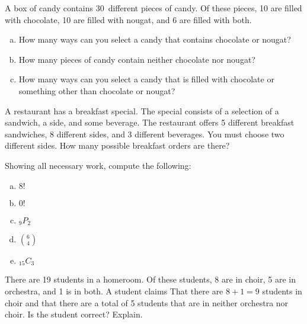 \documentclass[11pt,letterpaper]{article}
\begin{document}

 A box of candy contains 30~different pieces of candy. Of these pieces, 10 are filled with chocolate, 10 are filled with nougat, and 6 are filled with both. 
	\begin{enumerate}[(a)]
	\item How many ways can you select a candy that contains chocolate or nougat?
	\item How many pieces of candy contain neither chocolate nor nougat?
	\item How many ways can you select a candy that is filled with chocolate or something other than chocolate or nougat?
	\end{enumerate} 



\newpage



 A restaurant has a breakfast special. The special consists of a selection of a sandwich, a side, and some beverage. The restaurant offers 5 different breakfast sandwiches, 8 different sides, and 3 different beverages. You must choose two different sides. How many possible breakfast orders are there? 



\newpage



 Showing all necessary work, compute the following:
	\begin{enumerate}[(a)]
	\item $8!$
	\item $0!$
	\item $_9P_2$
	\item $\binom{6}{4}$
	\item $_{15}C_3$
	\end{enumerate}



\newpage



 There are 19 students in a homeroom. Of these students, 8 are in choir, 5 are in orchestra, and 1 is in both. A student claims That there are $8 + 1= 9$ students in choir and that there are a total of 5 students that are in neither orchestra nor choir. Is the student correct? Explain. 
\end{document}
